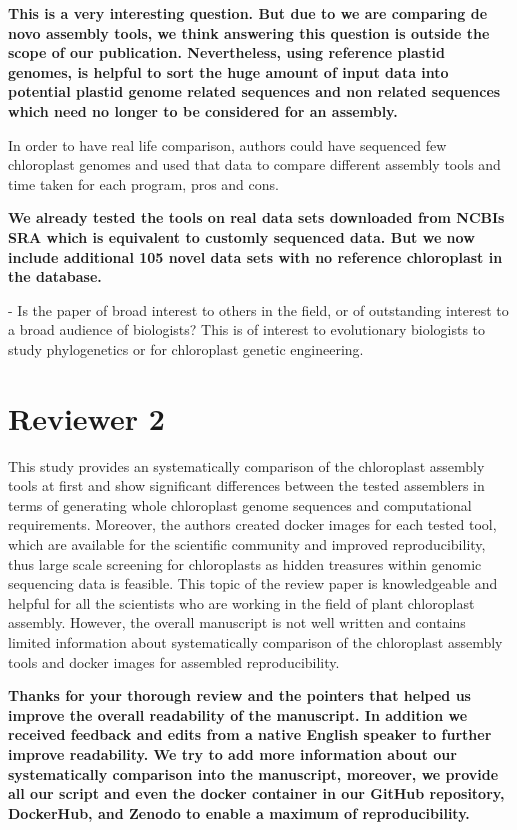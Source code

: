 \documentclass[a4paper,10pt]{scrartcl}
\begin{document}
\textbf{
This is a very interesting question.
But due to we are comparing de novo assembly tools, we think answering this question is outside the scope of our publication.
Nevertheless, using reference plastid genomes, is helpful to sort the huge amount of input data into potential plastid genome related sequences and non related sequences which need no longer to be considered for an assembly.
}

In order to have real life comparison, authors could have sequenced few chloroplast genomes and used that data to compare different assembly tools and time taken for each program, pros and cons.

\textbf{
We already tested the tools on real data sets downloaded from NCBIs SRA which is equivalent to customly sequenced data.
But we now include additional 105 novel data sets with no reference chloroplast in the database.
}

- Is the paper of broad interest to others in the field, or of outstanding interest to a broad audience of biologists?
This is of interest to evolutionary biologists to study phylogenetics or for chloroplast genetic engineering.

\section{Reviewer 2}
This study provides an systematically comparison of the chloroplast assembly tools at first and show significant differences between the tested assemblers in terms of generating whole chloroplast genome sequences and computational requirements.
Moreover, the authors created docker images for each tested tool, which are available for the scientific community and improved reproducibility, thus large scale screening for chloroplasts as hidden treasures within genomic sequencing data is feasible.
This topic of the review paper is knowledgeable and helpful for all the scientists who are working in the field of plant chloroplast assembly.
However, the overall manuscript is not well written and contains limited information about systematically comparison of the chloroplast assembly tools and docker images for assembled reproducibility.

\textbf{
Thanks for your thorough review and the pointers that helped us improve the overall readability of the manuscript.
In addition we received feedback and edits from a native English speaker to further improve readability.
We try to add more information about our systematically comparison into the manuscript, moreover, we provide all our script and even the docker container in our GitHub repository, DockerHub, and Zenodo to enable a maximum of reproducibility.
}
\end{document}
